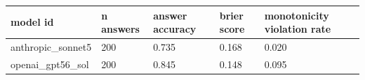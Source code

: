 \begin{tabular}{lllll}
\toprule
model id & n answers & answer accuracy & brier score & monotonicity violation rate \\
\midrule
anthropic\_sonnet5 & 200 & 0.735 & 0.168 & 0.020 \\
openai\_gpt56\_sol & 200 & 0.845 & 0.148 & 0.095 \\
\bottomrule
\end{tabular}
